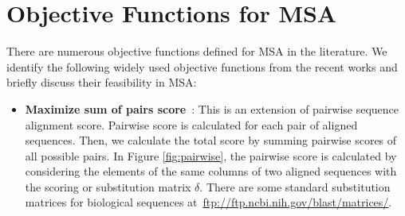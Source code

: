 \section{Objective Functions for MSA}
\label{sec:objective _function}
There are numerous objective functions defined for MSA in the literature. We identify the following widely used objective functions from the recent works and briefly discuss their feasibility in MSA:

\begin{itemize}
	
	\item \textbf{Maximize sum of pairs score}~\cite{seeluangsawat2005multiple, da2010alineaga}:  
	This is an extension of pairwise sequence alignment score. Pairwise score is calculated for each pair of aligned sequences. Then, we calculate the total score by summing pairwise scores of all possible pairs. In Figure \ref{fig:pairwise}, the pairwise score is calculated by considering the elements of the same columns of two aligned sequences with the scoring or substitution matrix $\delta$. There are some standard substitution matrices for biological sequences at~\url{ftp://ftp.ncbi.nih.gov/blast/matrices/}.
	

\end{itemize}
